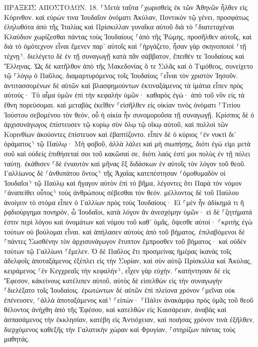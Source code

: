 \documentclass[twoside, 9pt]{extreport}
\begin{document}
ΠΡΑΞΕΙΣ ΑΠΟΣΤΟΛΩΝ.
18.
⸀Μετὰ ταῦτα ⸀χωρισθεὶς ἐκ τῶν Ἀθηνῶν ἦλθεν εἰς Κόρινθον. 
καὶ εὑρών τινα Ἰουδαῖον ὀνόματι Ἀκύλαν, Ποντικὸν τῷ γένει, προσφάτως ἐληλυθότα ἀπὸ τῆς Ἰταλίας καὶ Πρίσκιλλαν γυναῖκα αὐτοῦ διὰ τὸ ⸀διατεταχέναι Κλαύδιον χωρίζεσθαι πάντας τοὺς Ἰουδαίους ⸀ἀπὸ τῆς Ῥώμης, προσῆλθεν αὐτοῖς, 
καὶ διὰ τὸ ὁμότεχνον εἶναι ἔμενεν παρ᾽ αὐτοῖς καὶ ⸀ἠργάζετο, ἦσαν γὰρ σκηνοποιοὶ ⸂τῇ τέχνῃ⸃. 
διελέγετο δὲ ἐν τῇ συναγωγῇ κατὰ πᾶν σάββατον, ἔπειθέν τε Ἰουδαίους καὶ Ἕλληνας. 
Ὡς δὲ κατῆλθον ἀπὸ τῆς Μακεδονίας ὅ τε Σιλᾶς καὶ ὁ Τιμόθεος, συνείχετο τῷ ⸀λόγῳ ὁ Παῦλος, διαμαρτυρόμενος τοῖς Ἰουδαίοις ⸀εἶναι τὸν χριστὸν Ἰησοῦν. 
ἀντιτασσομένων δὲ αὐτῶν καὶ βλασφημούντων ἐκτιναξάμενος τὰ ἱμάτια εἶπεν πρὸς αὐτούς· Τὸ αἷμα ὑμῶν ἐπὶ τὴν κεφαλὴν ὑμῶν· καθαρὸς ἐγώ· ἀπὸ τοῦ νῦν εἰς τὰ ἔθνη πορεύσομαι. 
καὶ μεταβὰς ἐκεῖθεν ⸀εἰσῆλθεν εἰς οἰκίαν τινὸς ὀνόματι ⸀Τιτίου Ἰούστου σεβομένου τὸν θεόν, οὗ ἡ οἰκία ἦν συνομοροῦσα τῇ συναγωγῇ. 
Κρίσπος δὲ ὁ ἀρχισυνάγωγος ἐπίστευσεν τῷ κυρίῳ σὺν ὅλῳ τῷ οἴκῳ αὐτοῦ, καὶ πολλοὶ τῶν Κορινθίων ἀκούοντες ἐπίστευον καὶ ἐβαπτίζοντο. 
εἶπεν δὲ ὁ κύριος ⸂ἐν νυκτὶ δι᾽ ὁράματος⸃ τῷ Παύλῳ· Μὴ φοβοῦ, ἀλλὰ λάλει καὶ μὴ σιωπήσῃς, 
διότι ἐγώ εἰμι μετὰ σοῦ καὶ οὐδεὶς ἐπιθήσεταί σοι τοῦ κακῶσαί σε, διότι λαός ἐστί μοι πολὺς ἐν τῇ πόλει ταύτῃ. 
ἐκάθισεν ⸀δὲ ἐνιαυτὸν καὶ μῆνας ἓξ διδάσκων ἐν αὐτοῖς τὸν λόγον τοῦ θεοῦ. 
Γαλλίωνος δὲ ⸂ἀνθυπάτου ὄντος⸃ τῆς Ἀχαΐας κατεπέστησαν ⸂ὁμοθυμαδὸν οἱ Ἰουδαῖοι⸃ τῷ Παύλῳ καὶ ἤγαγον αὐτὸν ἐπὶ τὸ βῆμα, 
λέγοντες ὅτι Παρὰ τὸν νόμον ⸂ἀναπείθει οὗτος⸃ τοὺς ἀνθρώπους σέβεσθαι τὸν θεόν. 
μέλλοντος δὲ τοῦ Παύλου ἀνοίγειν τὸ στόμα εἶπεν ὁ Γαλλίων πρὸς τοὺς Ἰουδαίους· Εἰ ⸀μὲν ἦν ἀδίκημά τι ἢ ῥᾳδιούργημα πονηρόν, ὦ Ἰουδαῖοι, κατὰ λόγον ἂν ἀνεσχόμην ὑμῶν· 
εἰ δὲ ⸀ζητήματά ἐστιν περὶ λόγου καὶ ὀνομάτων καὶ νόμου τοῦ καθ᾽ ὑμᾶς, ὄψεσθε αὐτοί· ⸀κριτὴς ἐγὼ τούτων οὐ βούλομαι εἶναι. 
καὶ ἀπήλασεν αὐτοὺς ἀπὸ τοῦ βήματος. 
ἐπιλαβόμενοι δὲ ⸀πάντες Σωσθένην τὸν ἀρχισυνάγωγον ἔτυπτον ἔμπροσθεν τοῦ βήματος· καὶ οὐδὲν τούτων τῷ Γαλλίωνι ⸀ἔμελεν. 
Ὁ δὲ Παῦλος ἔτι προσμείνας ἡμέρας ἱκανὰς τοῖς ἀδελφοῖς ἀποταξάμενος ἐξέπλει εἰς τὴν Συρίαν, καὶ σὺν αὐτῷ Πρίσκιλλα καὶ Ἀκύλας, κειράμενος ⸂ἐν Κεγχρεαῖς τὴν κεφαλήν⸃, εἶχεν γὰρ εὐχήν. 
⸀κατήντησαν δὲ εἰς Ἔφεσον, κἀκείνους κατέλιπεν αὐτοῦ, αὐτὸς δὲ εἰσελθὼν εἰς τὴν συναγωγὴν ⸀διελέξατο τοῖς Ἰουδαίοις. 
ἐρωτώντων δὲ αὐτῶν ἐπὶ πλείονα χρόνον ⸀μεῖναι οὐκ ἐπένευσεν, 
⸂ἀλλὰ ἀποταξάμενος καὶ⸃ ⸀εἰπών· ⸀Πάλιν ἀνακάμψω πρὸς ὑμᾶς τοῦ θεοῦ θέλοντος ἀνήχθη ἀπὸ τῆς Ἐφέσου, 
καὶ κατελθὼν εἰς Καισάρειαν, ἀναβὰς καὶ ἀσπασάμενος τὴν ἐκκλησίαν, κατέβη εἰς Ἀντιόχειαν, 
καὶ ποιήσας χρόνον τινὰ ἐξῆλθεν, διερχόμενος καθεξῆς τὴν Γαλατικὴν χώραν καὶ Φρυγίαν, ⸀στηρίζων πάντας τοὺς μαθητάς. 
\end{document}
